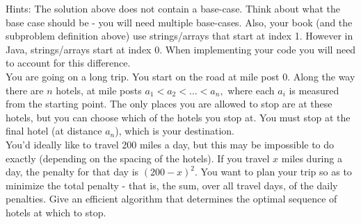 \documentclass[11pt]{exam}
\begin{document}
\begin{questions}
Hints: The solution above does not contain a base-case.  Think about what the base case should be - you will need multiple base-cases.  Also, your book (and the subproblem definition above) use strings/arrays that start at index 1.  However in Java, strings/arrays start at index 0.  When implementing your code you will need to account for this difference.\\

  
  You are going on a long trip.  You start on the road at mile post 0.  Along
  the way there are $n$ hotels, at mile posts $a_1 < a_2 < \ldots < a_n,$
  where each $a_i$ is measured from the starting point.  The only places you
  are allowed to stop are at these hotels, but you can choose which of the
  hotels you stop at.  You must stop at the final hotel (at distance $a_n$),
  which is your destination.\\

  You'd ideally like to travel 200 miles a day, but this may be impossible to
  do exactly (depending on the spacing of the hotels).  If you travel $x$
  miles during a day, the penalty for that day is $(200-x)^2.$  You want to
  plan your trip so as to minimize the total penalty - that is, the sum, over
  all travel days, of the daily penalties.  Give an efficient algorithm that
  determines the optimal sequence of hotels at which to stop.\\

\end{questions}
\\ 
\end{document}
